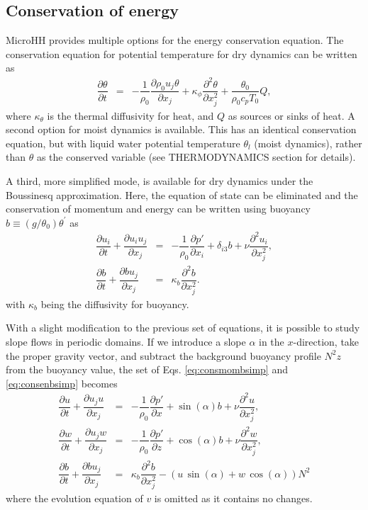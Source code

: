 \documentclass[gmd]{copernicus}
\begin{document}
\subsection{Conservation of energy}\label{sec:dyncore_energy}
\label{sec:conservation_of_energy}
MicroHH provides multiple options for the energy conservation equation. The conservation equation for  potential temperature for dry dynamics can be written as
\begin{eqnarray}
\dfrac{\partial \theta}{\partial t} & = & - \dfrac{1}{\rho_0} \dfrac{\partial \rho_0 u_j \theta}{\partial x_j} + \kappa_\phi \dfrac{\partial^2 \theta}{\partial x_j^2} + \dfrac{\theta_0}{\rho_0 c_p T_0} Q,
\end{eqnarray}
where $\kappa_\theta$ is the thermal diffusivity for heat, and $Q$ as sources or sinks of heat. A second option for moist dynamics is available. This has an identical conservation equation, but with liquid water potential temperature $\theta_l$ (moist dynamics), rather than $\theta$ as the conserved variable (see THERMODYNAMICS section for details).

A third, more simplified mode, is available for dry dynamics under the Boussinesq approximation. Here, the equation of state can be eliminated and the conservation of momentum and energy can be written using buoyancy $b \equiv (g/\theta_0)\theta^\prime$ as
\begin{eqnarray}
\dfrac{\partial u_i}{\partial t} + \dfrac{\partial u_i u_j}{\partial x_j} & = & 
- \dfrac{1}{\rho_0}\dfrac{\partial p'}{\partial x_i} + \delta_{i3} b + \nu \dfrac{\partial^2 u_i}{\partial x_j^2}\label{eq:consmombsimp},\\
\dfrac{\partial b}{\partial t} + \dfrac{\partial b u_j}{\partial x_j} & = & 
\kappa_b \dfrac{\partial^2 b}{\partial x_j^2}\label{eq:consenbsimp}.
\end{eqnarray}
with $\kappa_b$ being the diffusivity for buoyancy.

With a slight modification to the previous set of equations, it is possible to study slope flows in periodic domains. If we introduce a slope $\alpha$ in the $x$-direction, take the proper gravity vector, and subtract the background buoyancy profile $N^2 z$ from the buoyancy value, the set of Eqs. \ref{eq:consmombsimp} and \ref{eq:consenbsimp} becomes
\begin{eqnarray}
\dfrac{\partial u}{\partial t} + \dfrac{\partial u_j u}{\partial x_j} & = & 
- \dfrac{1}{\rho_0}\dfrac{\partial p'}{\partial x} + \sin(\alpha) b + \nu \dfrac{\partial^2 u}{\partial x_j^2}\label{eq:consuslope},\\
\dfrac{\partial w}{\partial t} + \dfrac{\partial u_j w}{\partial x_j} & = & 
- \dfrac{1}{\rho_0}\dfrac{\partial p'}{\partial z} + \cos(\alpha) b + \nu \dfrac{\partial^2 w}{\partial x_j^2}\label{eq:conswslope},\\
\dfrac{\partial b}{\partial t} + \dfrac{\partial b u_j}{\partial x_j} & = & 
\kappa_b \dfrac{\partial^2 b}{\partial x_j^2} - \left (u\,\sin(\alpha) + w\,\cos(\alpha) \right) N^2\label{eq:consbslope}
\end{eqnarray}
where the evolution equation of $v$ is omitted as it contains no changes.
\end{document}
